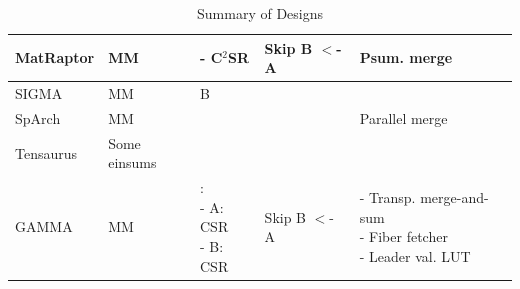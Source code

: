 \begin{table}[h]
{\begin{tabular}{||l|l|l|l|l|l||}
\hline
MatRaptor\cite{matraptor} & MM\cite{matraptor}\cite{teaal} & - C$^2$SR\cite{matraptor} & Skip B $<$- A & Psum. merge \\
\hline
SIGMA\cite{sigma} & MM\cite{sigma}\cite{teaal} & \parbox[t]{5cm}{B} & & \\
\hline
SpArch\cite{sparch} & MM\cite{sparch}\cite{teaal} & & & Parallel merge\cite{sparch} \\
\hline
Tensaurus\cite{tensaurus} & Some einsums\cite{tensaurus}\cite{teaal} & & & \\
\hline
GAMMA\cite{gamma} & MM\cite{gamma}\cite{teaal} & \parbox[t]{5cm}{\cite{gamma}: \\ - A: CSR \\ - B: CSR}  & \parbox[t]{5cm}{Skip B $<$- A} & \parbox[t]{5cm}{- Transp. merge-and-sum \\ - Fiber fetcher \\ - Leader val. LUT \\ } \\
\hline
\hline
\end{tabular}%
}
\caption{Summary of Designs}
\end{table}


